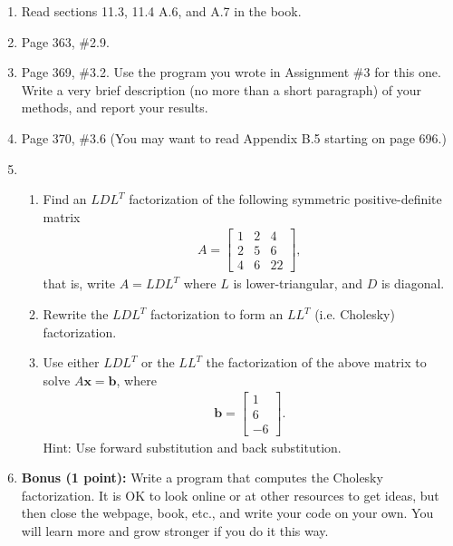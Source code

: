 \documentclass[12pt]{article}
\theoremstyle{plain}
\theoremstyle{definition}
\theoremstyle{remark}
\numberwithin{equation}{section} %
\numberwithin{figure}{section}   %
\newcommand{\vect}[1]{\mathbf{#1}}
\newcommand{\bx}{\vect{x}}
\begin{document}
\begin{enumerate}
 \item Read sections 11.3, 11.4 A.6, and A.7 in the book.
 

\item Page 363, \#2.9.

\item Page 369, \#3.2.  Use the program you wrote in Assignment \#3 for this one.  Write a very brief description (no more than a short paragraph) of your methods, and report your results.

\item Page 370, \#3.6 (You may want to read Appendix B.5 starting on page 696.)


\item \begin{enumerate}
\item 
Find an $LDL^T$ factorization of the following symmetric positive-definite matrix
\begin{align*}
 A = \begin{bmatrix}
      1 &2 &4\\
      2 &5 &6\\
      4 & 6 &22
     \end{bmatrix},
\end{align*}   
that is, write $A=LDL^T$ where $L$ is lower-triangular, and $D$ is diagonal.

\item Rewrite the $LDL^T$ factorization to form an $LL^T$ (i.e. Cholesky) factorization.

\item Use either $LDL^T$ or the $LL^T$ the factorization of the above matrix to solve $A\bx = \mathbf{b}$, where 
\begin{align*}
 \mathbf{b} = \begin{bmatrix}1\\6\\-6\end{bmatrix}.
\end{align*}
Hint: Use forward substitution and back substitution.

 \end{enumerate}
 
\item \textbf{Bonus (1 point):} Write a program that computes the Cholesky factorization.  It is OK to look online or at other resources to get ideas, but then close the webpage, book, etc., and write your code on your own.  You will learn more and grow stronger if you do it this way.




\end{enumerate}
\end{document}
